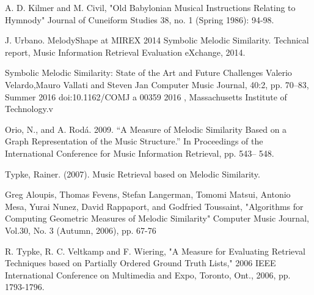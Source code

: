 \documentclass{llncs}
\begin{document}
	\begin{thebibliography}{7}
	
	A. D. Kilmer and M. Civil, 
	"Old Babylonian Musical Instructions Relating to Hymnody" 
	Journal of Cuneiform Studies 38, 
	no. 1 (Spring 1986): 94-98.

	J. Urbano. MelodyShape at 
	MIREX 2014 Symbolic Melodic Similarity. 
	Technical report, Music Information Retrieval Evaluation eXchange, 2014.

	Symbolic Melodic Similarity: State of the Art and Future Challenges
	Valerio Velardo,Mauro Vallati and Steven Jan
	Computer Music Journal, 40:2, pp. 70–83, Summer 2016 doi:10.1162/COMJ a 00359
	2016 , Massachusetts Institute of Technology.v

	 Orio, N., and A. Rodá. 2009. “A Measure of Melodic Similarity Based on a Graph Representation of the Music Structure.” In Proceedings of the International Conference for Music Information Retrieval, pp. 543– 548.

	 Typke, Rainer. (2007). Music Retrieval based on Melodic Similarity.

	 Greg Aloupis, Thomas Fevens, Stefan Langerman, Tomomi Matsui, Antonio Mesa, Yurai Nunez, David Rappaport, and Godfried Toussaint, "Algorithms for Computing Geometric Measures of Melodic Similarity" Computer Music Journal, Vol.30, No. 3 (Autumn, 2006), pp. 67-76

	 R. Typke, R. C. Veltkamp and F. Wiering, "A Measure for Evaluating Retrieval Techniques based on Partially Ordered Ground Truth Lists," 2006 IEEE International Conference on Multimedia and Expo, Toronto, Ont., 2006, pp. 1793-1796.

	\end{thebibliography}

	
\end{document}
